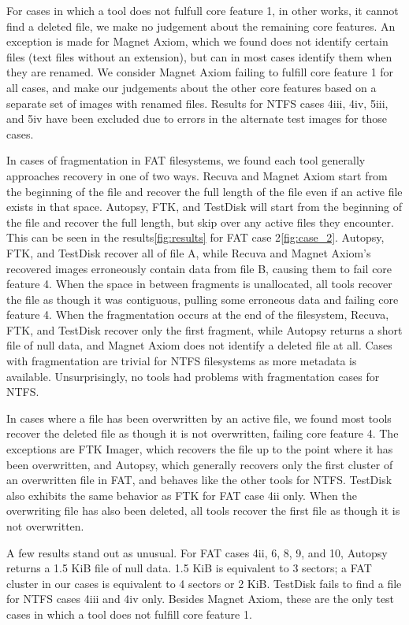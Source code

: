 For cases in which a tool does not fulfull core feature 1, in other works, it cannot find a deleted file, we make no judgement about the remaining core features. An exception is made for Magnet Axiom, which we found does not identify certain files (text files without an extension), but can in most cases identify them when they are renamed. We consider Magnet Axiom failing to fulfill core feature 1 for all cases, and make our judgements about the other core features based on a separate set of images with renamed files. Results for NTFS cases 4iii, 4iv, 5iii, and 5iv have been excluded due to errors in the alternate test images for those cases.

In cases of fragmentation in FAT filesystems, we found each tool generally approaches recovery in one of two ways. Recuva and Magnet Axiom start from the beginning of the file and recover the full length of the file even if an active file exists in that space. Autopsy, FTK, and TestDisk will start from the beginning of the file and recover the full length, but skip over any active files they encounter. This can be seen in the results\ref{fig:results} for FAT case 2\ref{fig:case_2}. Autopsy, FTK, and TestDisk recover all of file A, while Recuva and Magnet Axiom's recovered images erroneously contain data from file B, causing them to fail core feature 4. When the space in between fragments is unallocated, all tools recover the file as though it was contiguous, pulling some erroneous data and failing core feature 4. When the fragmentation occurs at the end of the filesystem, Recuva, FTK, and TestDisk recover only the first fragment, while Autopsy returns a short file of null data, and Magnet Axiom does not identify a deleted file at all. Cases with fragmentation are trivial for NTFS filesystems as more metadata is available. Unsurprisingly, no tools had problems with fragmentation cases for NTFS.

In cases where a file has been overwritten by an active file, we found most tools recover the deleted file as though it is not overwritten, failing core feature 4. The exceptions are FTK Imager, which recovers the file up to the point where it has been overwritten, and Autopsy, which generally recovers only the first cluster of an overwritten file in FAT, and behaves like the other tools for NTFS. TestDisk also exhibits the same behavior as FTK for FAT case 4ii only. When the overwriting file has also been deleted, all tools recover the first file as though it is not overwritten.

A few results stand out as unusual. For FAT cases 4ii, 6, 8, 9, and 10, Autopsy returns a 1.5 KiB file of null data. 1.5 KiB is equivalent to 3 sectors; a FAT cluster in our cases is equivalent to 4 sectors or 2 KiB.
TestDisk fails to find a file for NTFS cases 4iii and 4iv only. Besides Magnet Axiom, these are the only test cases in which a tool does not fulfill core feature 1.

